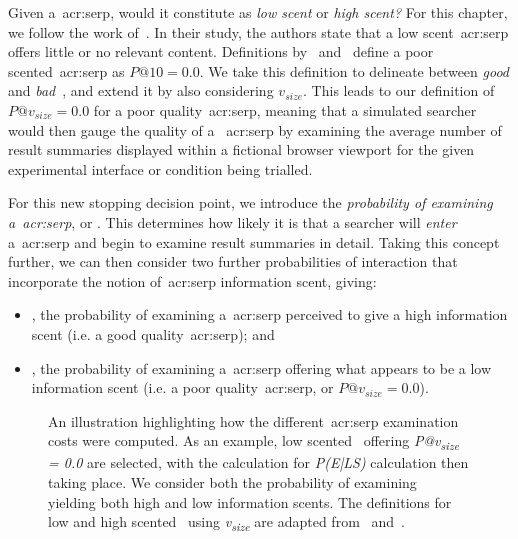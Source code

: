  Given a~\gls{acr:serp}, would it constitute as \emph{low scent} or \emph{high scent?} For this chapter, we follow the work of~\cite{wu2014information_scent}. In their study, the authors state that a low scent~\gls{acr:serp} offers little or no relevant content. Definitions by~\cite{wu2014information_scent} and~\cite{hassan2013serp_abandonment} define a poor scented~\gls{acr:serp} as $P@10=0.0$. We take this definition to delineate between \emph{good} and \emph{bad}~, and extend it by also considering $v_{size}$. This leads to our definition of $P@v_{size}=0.0$ for a poor quality~\gls{acr:serp}, meaning that a simulated searcher would then gauge the quality of a ~\gls{acr:serp} by examining the average number of result summaries displayed within a fictional browser viewport for the given experimental interface or condition being trialled.

 For this new stopping decision point, we introduce the \emph{probability of examining a~\gls{acr:serp}}, or . This determines how likely it is that a searcher will \emph{enter} a~\gls{acr:serp} and begin to examine result summaries in detail. Taking this concept further, we can then consider two further probabilities of interaction that incorporate the notion of~\gls{acr:serp} information scent, giving:

\begin{itemize}
    \item{, the probability of examining a~\gls{acr:serp} perceived to give a high information scent (i.e. a good quality~\gls{acr:serp}); and}
    \item{, the probability of examining a~\gls{acr:serp} offering what appears to be a low information scent (i.e. a poor quality~\gls{acr:serp}, or $P@v_{size}=0.0$).}
\end{itemize}

\begin{figure}[t!]
    \centering
    \caption[Computing~\gls{acr:serp} examination probabilities]{An illustration highlighting how the different~\gls{acr:serp} examination costs were computed. As an example, low scented~ offering \emph{P@v\textsubscript{size} = 0.0} are selected, with the calculation for \emph{P(E|LS)} calculation then taking place. We consider both the probability of examining~ yielding both high and low information scents. The definitions for low and high scented~ using \emph{v\textsubscript{size}} are adapted from~\cite{wu2014information_scent} and~\cite{hassan2013serp_abandonment}.}
    \label{fig:serp_probabilities}
\end{figure}

